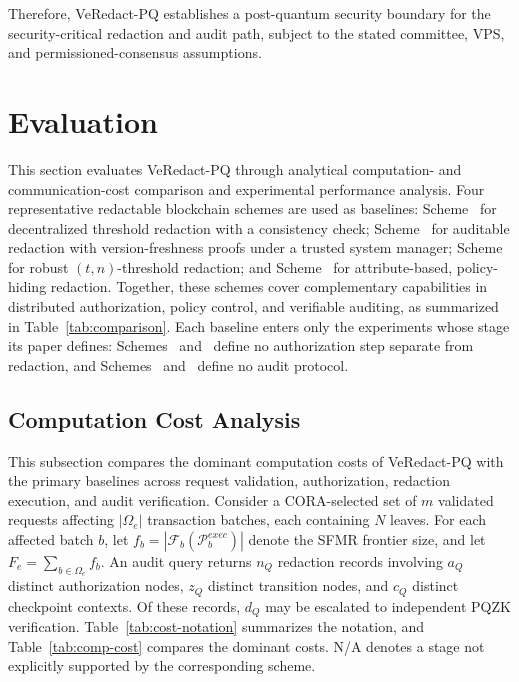\documentclass[lettersize,journal]{IEEEtran}
\begin{document}
Therefore, VeRedact-PQ establishes a post-quantum security boundary for
the security-critical redaction and audit path, subject to the stated
committee, VPS, and permissioned-consensus assumptions.

    
    
    \section{Evaluation}
    \label{sec:evaluation}
    
    This section evaluates VeRedact-PQ through analytical computation- and
    communication-cost comparison and experimental performance analysis.
    Four representative redactable blockchain schemes are used as
    baselines: Scheme~\cite{ref1} for decentralized threshold
    redaction with a consistency check; Scheme~\cite{ref13} for auditable redaction
    with version-freshness proofs under a trusted system manager;
    Scheme~\cite{ref27} for robust $(t,n)$-threshold redaction;
    and Scheme~\cite{ref34} for attribute-based,
    policy-hiding redaction. Together, these schemes cover complementary
    capabilities in distributed authorization, policy control, and
    verifiable auditing, as summarized in Table~\ref{tab:comparison}. Each
    baseline enters only the experiments whose stage its paper defines:
    Schemes~\cite{ref13} and~\cite{ref27} define no authorization step
    separate from redaction, and Schemes~\cite{ref27} and~\cite{ref34}
    define no audit protocol.

\subsection{Computation Cost Analysis}
\label{subsec:computation-cost}

This subsection compares the dominant computation costs of VeRedact-PQ
with the primary baselines across request validation, authorization,
redaction execution, and audit verification. Consider a CORA-selected
set of $m$ validated requests affecting $|\Omega_e|$ transaction
batches, each containing $N$ leaves. For each affected batch $b$, let
$f_b=|\mathcal{F}_b(\mathcal{P}_b^{exec})|$ denote the SFMR frontier
size, and let $F_e=\sum_{b\in\Omega_e}f_b$. An audit query returns
$n_Q$ redaction records involving $a_Q$ distinct authorization nodes,
$z_Q$ distinct transition nodes, and $c_Q$ distinct checkpoint
contexts. Of these records, $d_Q$ may be escalated to independent PQZK
verification. Table~\ref{tab:cost-notation} summarizes the notation,
and Table~\ref{tab:comp-cost} compares the dominant costs. N/A denotes
a stage not explicitly supported by the corresponding scheme.
\end{document}
